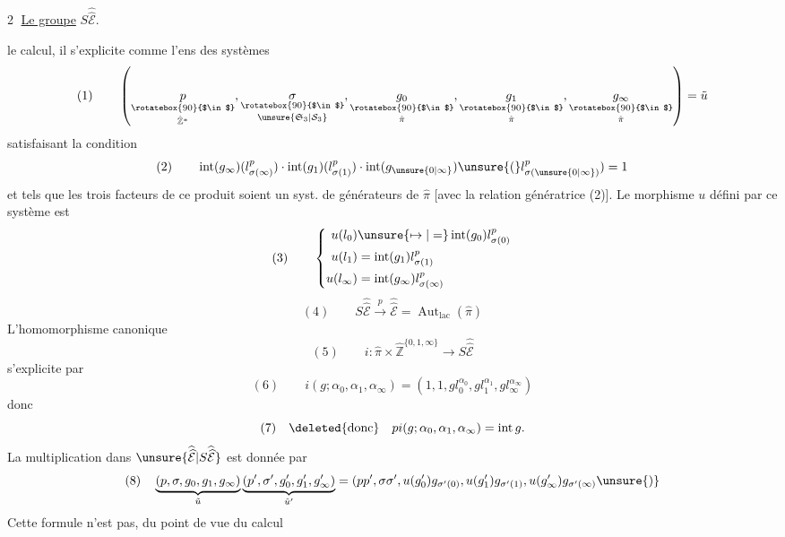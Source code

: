 \textcircled{2} \uline{Le groupe} $S\widehat{\widehat{\mathcal E}}$.

 le calcul, il s'explicite comme l'ens des systèmes
\[
(1)\qquad\left(\underset{\hat{\mathbb Z}^{*}}{\underset{\rotatebox{90}{$\in$}}{p}},\underset{\unsure{\mathfrak S_3|\mathcal S_3}}{\underset{\rotatebox{90}{$\in$}}{\sigma}},\underset{\hat\pi}{\underset{\rotatebox{90}{$\in$}}{g_0}},\underset{\hat\pi}{\underset{\rotatebox{90}{$\in$}}{g_1}},\underset{\hat\pi}{\underset{\rotatebox{90}{$\in$}}{g_\infty}}\right)=\tilde u
\]
satisfaisant la condition
\[
(2)\qquad\operatorname{int}(g_\infty)(l_{\sigma(\infty)}^p)\cdot\operatorname{int}(g_1)(l_{\sigma(1)}^p)\cdot\operatorname{int}(g_{\unsure{0|\infty}})\unsure{(}l_{\sigma(\unsure{0|\infty})}^p)=1
\]
et tels que les trois facteurs de ce produit soient un syst. de générateurs de $\hat\pi$ [avec la relation génératrice (2)]. Le morphisme $u$ défini par ce  système est
\[
(3)\qquad\left\{\begin{aligned}
u(l_0)&\unsure{\mapsto|=}\operatorname{int}(g_0)l_{\sigma(0)}^p\\
u(l_1)&=\operatorname{int}(g_1)l_{\sigma(1)}^p\\
u(l_\infty)&=\operatorname{int}(g_\infty)l_{\sigma(\infty)}^p
\end{aligned}\right.
\]
\[
(4)\qquad S\widehat{\widehat{\mathcal E}}\xrightarrow{p}\widehat{\widehat{\mathcal E}}=\operatorname{Aut}_{\mathrm{lac}}(\hat\pi)
\]
L'homomorphisme canonique
\[
(5)\qquad i:\hat\pi\times\hat{\mathbb Z}^{\{0,1,\infty\}}\longrightarrow S\widehat{\widehat{\mathcal E}}
\]
s'explicite par
\[
(6)\qquad i(g;\alpha_0,\alpha_1,\alpha_\infty)=(1,1,gl_0^{\alpha_0},gl_1^{\alpha_1},gl_\infty^{\alpha_\infty})
\]
donc
\[
(7)\quad\deleted{\text{donc}}\quad pi(g;\alpha_0,\alpha_1,\alpha_\infty)=\operatorname{int}g.
\]
La multiplication dans $\unsure{\widehat{\widehat{\mathcal E}}|S\widehat{\widehat{\mathcal E}}}$ est donnée par
\[
(8)\quad\underbrace{(p,\sigma,g_0,g_1,g_\infty)}_{\tilde u}\underbrace{(p',\sigma',g'_0,g'_1,g'_\infty)}_{\tilde u'}=(pp',\sigma\sigma',u(g'_0)g_{\sigma'(0)},u(g'_1)g_{\sigma'(1)},u(g'_\infty)g_{\sigma'(\infty)}\unsure{)}
\]
Cette formule n'est pas, du point de vue du calcul
